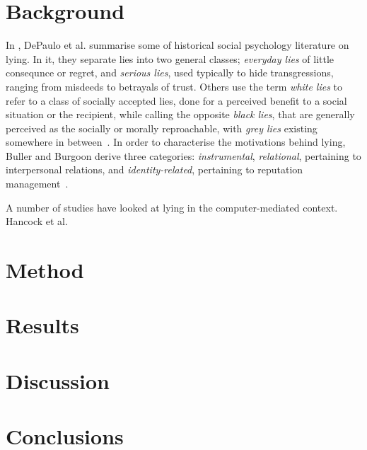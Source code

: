 \documentclass{sig-alternate}
\begin{document}
\section{Background}


In \cite{depaulo2003cues}, DePaulo et al. summarise some of historical social psychology literature on lying. In it, they separate lies into two general classes; \emph{everyday lies} of little consequnce or regret, and \emph{serious lies}, used typically to hide transgressions, ranging from misdeeds to betrayals of trust. Others use the term \emph{white lies} to refer to a class of socially accepted lies, done for a perceived benefit to a social situation or the recipient, while calling the opposite \emph{black lies}, that are generally perceived as the socially or morally reproachable, with \emph{grey lies} existing somewhere in between~\cite{camden1984white}.  In order to characterise the motivations behind lying, Buller and Burgoon derive three categories: \emph{instrumental}, \emph{relational}, pertaining to interpersonal relations, and \emph{identity-related}, pertaining to reputation management~\cite{buller1996testing}. 

A number of studies have looked at lying in the computer-mediated context.  Hancock et al.\cite{hancock2004deception}

\section{Method}

\section{Results}

\section{Discussion}

\section{Conclusions}
\end{document}
